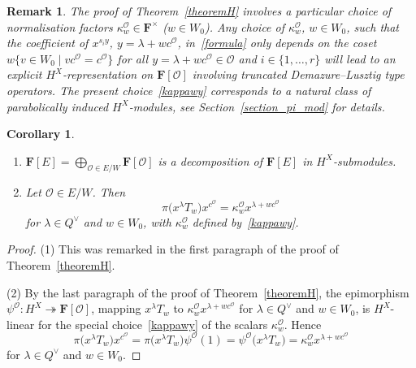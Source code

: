\documentclass[pdftex]{sigma}
\numberwithin{equation}{section}
\newtheorem{Corollary}[Theorem]{Corollary}
\newtheorem{Remark}[Theorem]{Remark} }
\begin{document}
\begin{Remark}\label{H_remark}
The proof of Theorem~\ref{theoremH} involves a particular choice of normalisation factors $\kappa_w^{\mathcal{O}}\in\mathbf{F}^\times$ ($w\in W_0$). Any choice of $\kappa_w^\mathcal{O}$, $w\in W_0$, such that the coefficient of $x^{s_iy}$, ${y=\lambda+wc^{\mathcal{O}}}$, in~\eqref{formula} only depends on the coset $w\{v\in W_0 \mid vc^\mathcal{O}=c^\mathcal{O}\}$ for all ${y=\lambda+wc^\mathcal{O}\in\mathcal{O}}$ and ${i\in\{1,\dots,r\}}$
will lead to an explicit $H^X$-representation on $\mathbf{F}[\mathcal{O}]$ involving truncated Demazure--Lusztig type operators. The present choice~\eqref{kappawy} corresponds to a natural class of parabolically induced $H^X$-modules,
see Section~\ref{section_pi_mod} for details.
\end{Remark}
\begin{Corollary}\label{corpsi}\hfill
\begin{enumerate}\itemsep=0pt
\item[$(1)$] $\mathbf{F}[E]=\bigoplus_{\mathcal{O}\in E/W}\mathbf{F}[\mathcal{O}]$ is a decomposition of $\mathbf{F}[E]$ in $H^X$-submodules.
\item[$(2)$] Let $\mathcal{O}\in E/W$. Then
\begin{equation*}%
\pi\bigl(x^\lambda T_w\bigr)x^{c^\mathcal{O}}=\kappa_w^\mathcal{O}x^{\lambda+wc^\mathcal{O}}
\end{equation*}
for $\lambda\in Q^\vee$ and $w\in W_0$,
with $\kappa_w^\mathcal{O}$ defined by~\eqref{kappawy}.
\end{enumerate}
\end{Corollary}

 \begin{proof}
 (1) This was remarked in the first paragraph of the proof of Theorem~\ref{theoremH}.

(2) By the last paragraph of the proof of Theorem~\ref{theoremH}, the epimorphism $\psi^\mathcal{O}\colon H^X\twoheadrightarrow\mathbf{F}[\mathcal{O}]$, mapping
$x^\lambda T_w$ to $\kappa_w^\mathcal{O}x^{\lambda+wc^\mathcal{O}}$ for $\lambda\in Q^\vee$ and $w\in W_0$, is $H^X$-linear for the special choice~\eqref{kappawy} of the scalars $\kappa_w^\mathcal{O}$. Hence
\[
\pi\bigl(x^\lambda T_w\bigr)x^{c^\mathcal{O}}=\pi\bigl(x^\lambda T_w\bigr)\psi^\mathcal{O}(1)=\psi^\mathcal{O}\bigl(x^\lambda T_w\bigr)=
\kappa_w^\mathcal{O}x^{\lambda+wc^\mathcal{O}}
\]
for $\lambda\in Q^\vee$ and $w\in W_0$.
 \end{proof}
\end{document}
